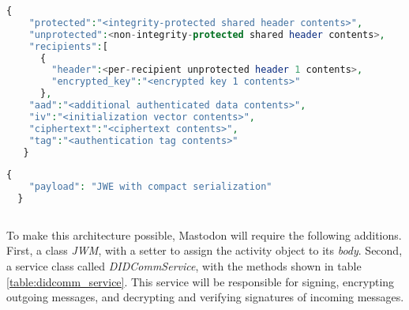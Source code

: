 \lstset{style=JSONStyle}
\begin{lstlisting}[language=PHP, caption=JWE JSON serialization \cite{jones_hildebrand_2015}, label=lst:json_jwe, float=h!]
  {
    "protected":"<integrity-protected shared header contents>",
    "unprotected":<non-integrity-protected shared header contents>,
    "recipients":[
      {
        "header":<per-recipient unprotected header 1 contents>,
        "encrypted_key":"<encrypted key 1 contents>"
      },
    "aad":"<additional authenticated data contents>",
    "iv":"<initialization vector contents>",
    "ciphertext":"<ciphertext contents>",
    "tag":"<authentication tag contents>"
   }
\end{lstlisting}

\lstset{style=JSONStyle}
\begin{lstlisting}[language=PHP, caption=Alternativ payload structure, label=lst:alternative_payload, float=h!]
  { 
    "payload": "JWE with compact serialization" 
  }
   
\end{lstlisting}

To make this architecture possible, Mastodon will require the following additions. First, a class \emph{JWM}, with a setter to assign the activity object to its \emph{body}. Second, a service class called \emph{DIDCommService}, with the methods shown in table \ref{table:didcomm_service}. This service will be responsible for signing, encrypting outgoing messages, and decrypting and verifying signatures of incoming messages. 

